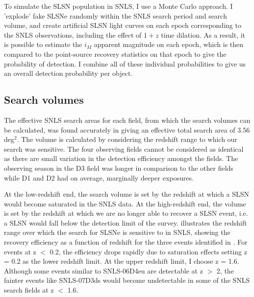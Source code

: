 To simulate the SLSN population in SNLS, I use a Monte Carlo approach. I 'explode' fake SLSNe randomly within the SNLS search period and search volume, and create artificial SLSN light curves on each epoch corresponding to the SNLS observations, including the effect of $1+z$ time dilation. As a result, it is possible to estimate the $i_M$ apparent magnitude on each epoch, which is then compared to the point-source recovery statistics on that epoch to give the probability of detection. I combine all of these individual probabilities to give us an overall detection probability per object.

\subsection{Search volumes}
\label{sec:search-volumes}
The effective SNLS search areas for each field, from which the search volumes can be calculated, was found accurately in \citet{Perrett2012} giving an effective total search area of 3.56\,deg$^2$. The volume is calculated by considering the redshift range to which our search was sensitive. The four observing fields cannot be considered as identical as there are small variation in the detection efficiency amongst the fields. The observing season in the D3 field was longer in comparison to the other fields while D1 and D2 had on average, marginally deeper exposures.

At the low-redshift end, the search volume is set by the redshift at which a SLSN would become saturated in the SNLS data. At the high-redshift end, the volume is set by the redshift at which we are no longer able to recover a SLSN event, i.e. a SLSN would fall below the detection limit of the survey.  illustrates the redshift range over which the search for SLSNe is sensitive to in SNLS, showing the recovery efficiency as a function of redshift for the three events identified in . For events at z $<$ 0.2, the efficiency drops rapidly due to saturation effects setting z = 0.2 as the lower redshift limit. At the upper redshift limit, I choose z = 1.6. Although some events similar to SNLS-06D4eu are detectable at z $>$ 2, the fainter events like SNLS-07D3ds would become undetectable in some of the SNLS search fields at z $<$ 1.6.

